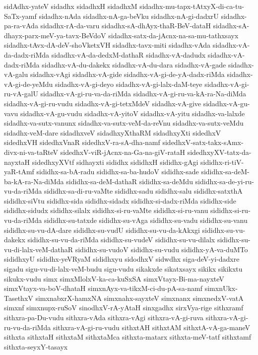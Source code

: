 {sidAdhx-yateV
sidadhx
sidadhxH
sidadhxM
sidadhx-mu-tapx-tAtxyX-di-ca-tu-SaTx-yamf
sidadhx-nAda
sidadhx-nA-ga-beVku
sidadhx-nA-gi-dadxrU
sidadhx-pa-ra-vAda
sidadhx-rA-da-varu
sidadhx-sA-dhAyx-thaR-BeV-dataH
sidadhx-sA-dhayx-parx-meV-ya-tavx-BeVdoV
sidadhx-satx-da-jAcnx-na-sa-mu-tathxsayx
sidadhx-tAvx-dA-deV-shoVketxVH
sidadhx-tavx-miti
sidadhx-vAda
sidadhx-vA-da-dadx-riMda
sidadhx-vA-da-dedxM-dathaR
sidadhx-vA-dadudx
sidadhx-vA-dadx-riMda
sidadhx-vA-du-dakekx
sidadhx-vA-du-dara
sidadhx-vA-gade
sidadhx-vA-galu
sidadhx-vAgi
sidadhx-vA-gide
sidadhx-vA-gi-de-yA-dadx-riMda
sidadhx-vA-gi-de-yeMdu
sidadhx-vA-gi-deyo
sidadhx-vA-gi-lalx-daM-teye
sidadhx-vA-gi-ru-vA-galU
sidadhx-vA-gi-ru-va-da-riMda
sidadhx-vA-gi-ru-va-kA-ra-Na-diMda
sidadhx-vA-gi-ru-vudu
sidadhx-vA-gi-tetxMdeV
sidadhx-vA-give
sidadhx-vA-gu-vavu
sidadhx-vA-gu-vudu
sidadhx-vA-yitoV
sidadhx-vA-yitu
sidadhx-va-lalxde
sidadhx-va-sutx-vanunx
sidadhx-va-sutx-veM-da-reVnu
sidadhx-va-sutx-veMdu
sidadhx-veM-dare
sidadhxveV
sidadhxyXthaRM
sidadhxyXti
sidedhxV
sidedhxVH
sidedhxVnaR
sidedhxV-ra-sA-dha-namf
sidedhxV-satx-takx-sAmx-divx-ni-va-taRteV
sidedhxV-viR-jAcnx-na-Ga-na-giV-rataH
sidedhxyXV-tatx-da-nayxtaH
sidedhxyXVtf
sidhayxti
sididhx
sididhxH
sididhx-gAgi
sididhx-ri-tiV-yaR-tAmf
sididhx-sa-bA-radu
sididhx-sa-ba-hudoV
sididhx-sade
sididhx-sa-deM-ba-kA-ra-Na-diMda
sididhx-sa-deM-dathaR
sididhx-sa-deMdu
sididhx-sa-de-yi-ru-vu-da-riMda
sididhx-sa-di-ru-vaMte
sididhx-sadu
sididhx-salu
sididhx-satxthA
sididhx-siVtu
sididhx-sida
sididhx-sidadx
sididhx-si-dadx-riMda
sididhx-side
sididhx-sidudx
sididhx-silalx
sididhx-si-ru-vaMte
sididhx-si-ru-vanu
sididhx-si-ru-vu-da-riMda
sididhx-su-tatxde
sididhx-su-vAga
sididhx-su-vadu
sididhx-su-vanu
sididhx-su-vu-dA-dare
sididhx-su-vudU
sididhx-su-vu-da-kAkxgi
sididhx-su-vu-dakekx
sididhx-su-vu-da-riMda
sididhx-su-vudeV
sididhx-su-vu-dilalx
sididhx-su-vu-di-lalx-veM-dathaR
sididhx-su-vudoV
sididhx-su-vudu
sididhx-yA-va-duMTo
sididhxyU
sididhx-yeVRyaM
sididhxyu
sidodhxV
sidwdhx
siga-deV-yi-dadxre
sigadu
sigu-vu-di-lalx-veM-budu
sigu-vudu
sikakxde
sikatxsayx
sikikx
sikikxtu
sikukx-vudu
simx
simxMlolxV-ka-ca-kuSxSA
simxVtayx-Bi-ma-nayxteV
simxVtayx-va-boV-dhataH
simxnAyx-va-tikxM-ci-du-pA-sa-namf
simxnUkx-TasethxV
simxnabxrX-hamxNA
simxnahx-sayxteV
simxnanx
simxnedxV-vatA
simxnf
simxnupx-ruSoV
sinodhxV-rA-yAtaH
sinxgadhx
sirxVya-rige
sithxramf
sithxra-pa-Du-vudu
sithxra-vAda
sithxra-vAgi
sithxra-vA-gi-ruva
sithxra-vA-gi-ru-vu-da-riMda
sithxra-vA-gi-ru-vudu
sithxtAH
sithxtAM
sithxtA-vA-ga-maneV
sithxta
sithxtaH
sithxtaM
sithxtaMca
sithxta-matarx
sithxta-meV-tatf
sithxtamf
sithxta-seyxY-tasayx
}
